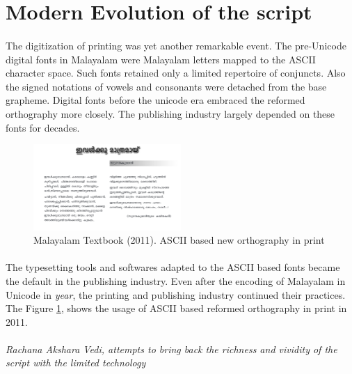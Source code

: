 \documentclass[10pt]{article}
\begin{document}
\section{Modern Evolution of the script}
\paragraph{}
The digitization of printing was yet another remarkable event. The pre-Unicode digital fonts in Malayalam were Malayalam letters mapped to the ASCII character space. Such fonts retained only a limited repertoire of conjuncts. Also the signed notations of vowels and consonants were detached from the base grapheme. Digital fonts before the unicode era embraced the reformed orthography more closely. The publishing industry largely depended on these fonts for decades.

\begin{figure}
 \centering
  \includegraphics[width=0.5\textwidth]{images/2011-Malayalam-Textbook.png}
 \caption{Malayalam Textbook (2011). ASCII based new orthography in print}
\label{textbook2011}
\end{figure}

\paragraph{}
The typesetting tools and softwares adapted to the ASCII based fonts became the default in the publishing industry. Even after the encoding of Malayalam in Unicode in \textit{year}, the printing and publishing industry continued their practices. The Figure \ref{textbook2011}, shows the usage of ASCII based reformed orthography in print in 2011.

\paragraph{}

\textit{Rachana Akshara Vedi, attempts to bring back the richness and vividity of the script with the limited technology}
\end{document}
